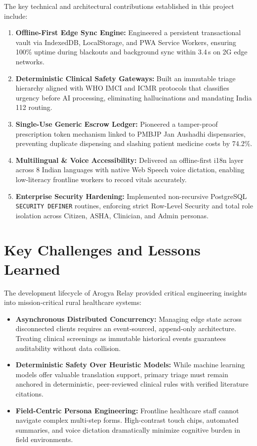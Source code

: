 \documentclass[12pt,a4paper,oneside]{report}
\begin{document}
The key technical and architectural contributions established in this project include:
\begin{enumerate}[label=\textbf{\arabic*.},itemsep=2pt,topsep=2pt,parsep=0pt]
    \item \textbf{Offline-First Edge Sync Engine:} Engineered a persistent transactional vault via IndexedDB, LocalStorage, and PWA Service Workers, ensuring 100\% uptime during blackouts and background sync within 3.4\,s on 2G edge networks.
    \item \textbf{Deterministic Clinical Safety Gateways:} Built an immutable triage hierarchy aligned with WHO IMCI and ICMR protocols that classifies urgency before AI processing, eliminating hallucinations and mandating India 112 routing.
    \item \textbf{Single-Use Generic Escrow Ledger:} Pioneered a tamper-proof prescription token mechanism linked to PMBJP Jan Aushadhi dispensaries, preventing duplicate dispensing and slashing patient medicine costs by 74.2\%.
    \item \textbf{Multilingual \& Voice Accessibility:} Delivered an offline-first i18n layer across 8 Indian languages with native Web Speech voice dictation, enabling low-literacy frontline workers to record vitals accurately.
    \item \textbf{Enterprise Security Hardening:} Implemented non-recursive PostgreSQL \texttt{SECURITY DEFINER} routines, enforcing strict Row-Level Security and total role isolation across Citizen, ASHA, Clinician, and Admin personas.
\end{enumerate}

\section{Key Challenges and Lessons Learned}
The development lifecycle of Arogya Relay provided critical engineering insights into mission-critical rural healthcare systems:
\begin{itemize}[leftmargin=1.5em,itemsep=2pt,topsep=2pt,parsep=0pt]
    \item \textbf{Asynchronous Distributed Concurrency:} Managing edge state across disconnected clients requires an event-sourced, append-only architecture. Treating clinical screenings as immutable historical events guarantees auditability without data collision.
    \item \textbf{Deterministic Safety Over Heuristic Models:} While machine learning models offer valuable translation support, primary triage must remain anchored in deterministic, peer-reviewed clinical rules with verified literature citations.
    \item \textbf{Field-Centric Persona Engineering:} Frontline healthcare staff cannot navigate complex multi-step forms. High-contrast touch chips, automated summaries, and voice dictation dramatically minimize cognitive burden in field environments.
\end{itemize}
\end{document}
